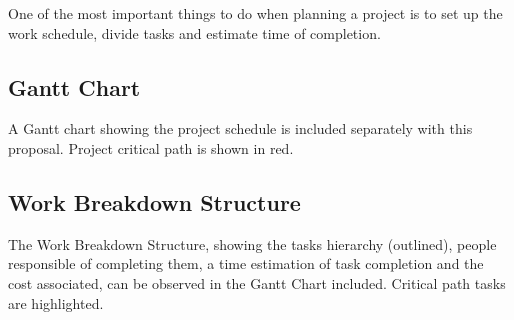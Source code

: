 One of the most important things to do when planning a project is to set up the work
schedule, divide tasks and estimate time of completion.

\subsection{Gantt Chart}
A Gantt chart showing the project schedule is included separately with this proposal. Project
critical path is shown in red.

\subsection{Work Breakdown Structure}
The Work Breakdown Structure, showing the tasks hierarchy (outlined), people responsible 
of completing them, a time estimation of task completion and 
the cost associated, can be observed in the Gantt Chart included. Critical path tasks are
highlighted.